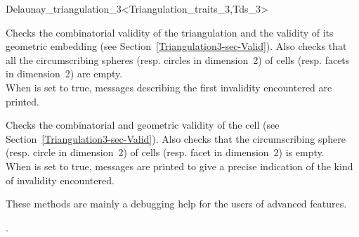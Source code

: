 \begin{ccRefClass}{Delaunay_triangulation_3<Triangulation_traits_3,Tds_3>}
\begin{ccAdvanced}
{Checks the combinatorial validity of the triangulation and the
validity of its geometric embedding (see
Section~\ref{Triangulation3-sec-Valid}). Also checks that all the
circumscribing spheres (resp. circles in dimension~2) of  cells
(resp. facets in dimension~2) are empty.\\ When  is set to
true,  messages describing the first invalidity encountered are
printed.}

{Checks the combinatorial and geometric validity of the cell (see
Section~\ref{Triangulation3-sec-Valid}). Also checks that the
circumscribing sphere (resp. circle in dimension~2) of  cells
(resp. facet in dimension~2) is empty.\\
 When  is set to
true, messages are printed to give
a precise indication of the kind of invalidity encountered.}

These methods are  mainly a debugging help for the users of advanced features.
\end{ccAdvanced}

\ccSeeAlso

.



\end{ccRefClass}


